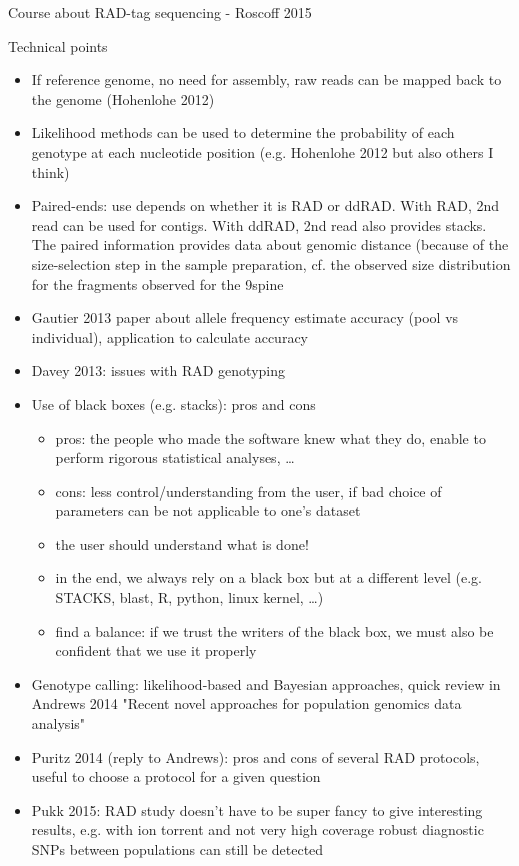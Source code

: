 \documentclass[presentation]{beamer}
\begin{document}
\begin{frame}[label=sec-1]{Course about RAD-tag sequencing - Roscoff 2015}
\begin{block}{Technical points}
\begin{itemize}
\item If reference genome, no need for assembly, raw reads can be mapped back to
the genome (Hohenlohe 2012)
\item Likelihood methods can be used to determine the probability of each genotype
at each nucleotide position (e.g. Hohenlohe 2012 but also others I think)
\item Paired-ends: use depends on whether it is RAD or ddRAD. With RAD, 2nd read
can be used for contigs. With ddRAD, 2nd read also provides stacks. The
paired information provides data about genomic distance (because of the
size-selection step in the sample preparation, cf. the observed size
distribution for the fragments observed for the 9spine
\item Gautier 2013 paper about allele frequency estimate accuracy (pool vs
individual), application to calculate accuracy
\item Davey 2013: issues with RAD genotyping
\item Use of black boxes (e.g. stacks): pros and cons
\begin{itemize}
\item pros: the people who made the software knew what they do, enable to perform
rigorous statistical analyses, \ldots{}
\item cons: less control/understanding from the user, if bad choice of parameters
can be not applicable to one's dataset
\item the user should understand what is done!
\item in the end, we always rely on a black box but at a different level
(e.g. STACKS, blast, R, python, linux kernel, \ldots{})
\item find a balance: if we trust the writers of the black box, we must also be
confident that we use it properly
\end{itemize}
\item Genotype calling: likelihood-based and Bayesian approaches, quick review in
Andrews 2014 "Recent novel approaches for population genomics data analysis"
\item Puritz 2014 (reply to Andrews): pros and cons of several RAD protocols,
useful to choose a protocol for a given question
\item Pukk 2015: RAD study doesn't have to be super fancy to give interesting
results, e.g. with ion torrent and not very high coverage robust diagnostic
SNPs between populations can still be detected
\end{itemize}
\end{block}


\end{frame}
\end{document}
